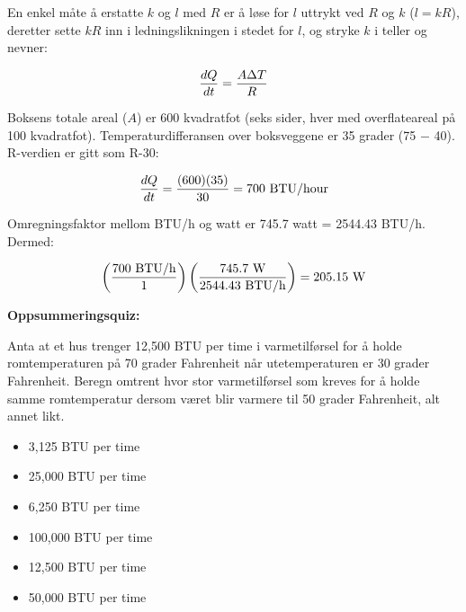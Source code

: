 





En enkel måte å erstatte $k$ og $l$ med $R$ er å løse for $l$ uttrykt ved $R$ og $k$ ($l = kR$), deretter sette $kR$ inn i ledningslikningen i stedet for $l$, og stryke $k$ i teller og nevner:

$${dQ \over dt} = {A {\Delta T} \over R}$$

Boksens totale areal ($A$) er 600 kvadratfot (seks sider, hver med overflateareal på 100 kvadratfot). Temperaturdifferansen over boksveggene er 35 grader (75 $-$ 40). R-verdien er gitt som R-30:

$${dQ \over dt} = {(600) (35) \over 30} = 700 \hbox{ BTU/hour}$$

Omregningsfaktor mellom BTU/h og watt er 745.7 watt = 2544.43 BTU/h. Dermed:

$$\left({700 \hbox{ BTU/h} \over 1}\right) \left( {745.7 \hbox{ W} \over 2544.43 \hbox{ BTU/h}} \right) = 205.15 \hbox{ W}$$






\vfil \eject

\noindent
{\bf Oppsummeringsquiz:}

Anta at et hus trenger 12,500 BTU per time i varmetilførsel for å holde romtemperaturen på 70 grader Fahrenheit når utetemperaturen er 30 grader Fahrenheit. Beregn omtrent hvor stor varmetilførsel som kreves for å holde samme romtemperatur dersom været blir varmere til 50 grader Fahrenheit, alt annet likt.

\begin{itemize}
\item{} 3,125 BTU per time
\vskip 5pt 
\item{} 25,000 BTU per time 
\vskip 5pt 
\item{} 6,250 BTU per time
\vskip 5pt 
\item{} 100,000 BTU per time
\vskip 5pt 
\item{} 12,500 BTU per time 
\vskip 5pt 
\item{} 50,000 BTU per time
\end{itemize}



